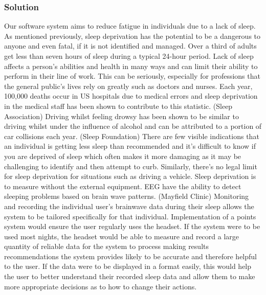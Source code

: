 \subsubsection{Solution}

Our software system aims to reduce fatigue in individuals due to a lack of sleep.
As mentioned previously, sleep deprivation has the potential to be a dangerous to anyone and even fatal, if it is not identified and managed.
Over a third of adults get less than seven hours of sleep during a typical 24-hour period.
Lack of sleep affects a person's abilities and health in many ways and can limit their ability to perform in their line of work.
This can be seriously, especially for professions that the general public’s lives rely on greatly such as doctors and nurses.
Each year, 100,000 deaths occur in US hospitals due to medical errors and sleep deprivation in the medical staff has been shown to contribute to this statistic.
(Sleep Association) Driving whilst feeling drowsy has been shown to be similar to driving whilst under the influence of alcohol and can be attributed to a portion of car collisions
each year. (Sleep Foundation) There are few visible indications that an individual is getting less sleep than recommended and it’s difficult to know if you are deprived of sleep
which often makes it more damaging as it may be challenging to identify and then attempt to curb. Similarly, there’s no legal limit for sleep deprivation for situations such as driving a vehicle.
Sleep deprivation is to measure without the external equipment. EEG have the ability to detect sleeping problems based on brain wave patterns. (Mayfield Clinic)
Monitoring and recording the individual user’s brainwave data during their sleep allows the system to be tailored specifically for that individual.
Implementation of a points system would ensure the user regularly uses the headset. If the system were to be used most nights,
the headset would be able to measure and record a large quantity of reliable data for the system to process making results recommendations
the system provides likely to be accurate and therefore helpful to the user.
If the data were to be displayed in a format easily, this would help the user to better understand their recorded sleep data and allow them to make more appropriate decisions as to how to change their actions.
